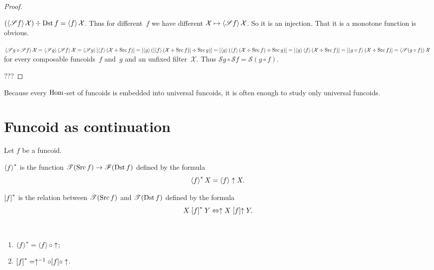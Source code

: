 \begin{proof}
~
\begin{widedisorder}
\item
$(\left\langle \mathscr{S}f\right\rangle\mathcal{X})\div\operatorname{Dst} f=
\left\langle f\right\rangle\mathcal{X}$.
Thus for different~$f$ we have different
$\mathcal{X}\mapsto\left\langle \mathscr{S}f\right\rangle\mathcal{X}$.
So it is an injection. That it is a monotone function
is obvious.

\item
$\left\langle \mathscr{S}g\circ\mathscr{S}f\right\rangle\mathcal{X}=
\left\langle \mathscr{S}g\right\rangle\left\langle \mathscr{S}f\right\rangle\mathcal{X}=
\left\langle \mathscr{S}g\right\rangle[\left\langle f\right\rangle(\mathcal{X}\div\operatorname{Src} f)]=
[\left\langle g\right\rangle([\left\langle f\right\rangle(\mathcal{X}\div\operatorname{Src} f)]\div\operatorname{Src} g)]=
[\left\langle g\right\rangle(\left\langle f\right\rangle(\mathcal{X}\div\operatorname{Src} f)\div\operatorname{Src} g)]=
[\left\langle g\right\rangle\left\langle f\right\rangle(\mathcal{X}\div\operatorname{Src} f)]=
[\left\langle g\circ f\right\rangle(\mathcal{X}\div\operatorname{Src} f)]=
\left\langle \mathscr{S}(g\circ f)\right\rangle\mathcal{X}$ for every
composable funcoids~$f$ and~$g$ and an unfixed
filter~$\mathcal{X}$. Thus
$\mathscr{S}g\circ\mathscr{S}f=\mathscr{S}(g\circ f)$.
\end{widedisorder}
???
\end{proof}

Because every $\operatorname{Hom}$-set of funcoids is embedded into universal
funcoids, it is often enough to study only universal funcoids.

\section{Funcoid as continuation}

Let $f$ be a funcoid.
\begin{defn}
$\left\langle f\right\rangle ^{\ast}$ is the function $\mathscr{T}(\operatorname{Src} f)\rightarrow\mathscr{F}(\operatorname{Dst} f)$
defined by the formula
\[
\left\langle f\right\rangle ^{\ast}X=\left\langle f\right\rangle\uparrow X.
\]

\end{defn}

\begin{defn}
$\mathrel{\left[f\right]^{\ast}}$ is the relation between $\mathscr{T}(\operatorname{Src} f)$ and $\mathscr{T}(\operatorname{Dst}
f)$
defined by the formula
\[
X\mathrel{\left[f\right]^{\ast}}Y\Leftrightarrow\uparrow X\mathrel{\left[f\right]}\uparrow Y.
\]
\end{defn}
\begin{obvious}
~
\begin{enumerate}
\item $\left\langle f\right\rangle ^{\ast}=\left\langle f\right\rangle\circ\uparrow$;
\item $\mathord{\mathrel{\left[f\right]^{\ast}}}=\uparrow^{-1}\circ\mathord{\mathrel{\left[f\right]}}\circ\uparrow$.
\end{enumerate}
\end{obvious}

